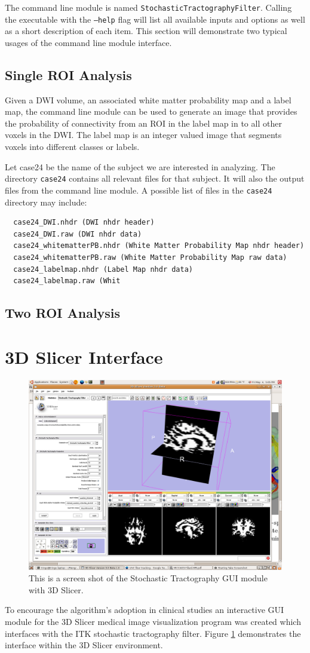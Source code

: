 The command line module is named \texttt{StochasticTractographyFilter}.  Calling the executable with the \texttt{--help} flag will list all available inputs and options as well as a short description of each item.  This section will demonstrate two typical usages of the command line module interface.

\subsection{Single ROI Analysis}
Given a DWI volume, an associated white matter probability map and a label map, the command line module can be used to generate an image that provides the probability of connectivity from an ROI in the label map in to all other voxels in the DWI.  The label map is an integer valued image that segments voxels into different classes or labels.

Let case24 be the name of the subject we are interested in analyzing.  The directory \texttt{case24} contains all relevant files for that subject.  It will also the output files from the command line module.  A possible list of files in the \texttt{case24} directory may include:
\begin{verbatim}
  case24_DWI.nhdr (DWI nhdr header)
  case24_DWI.raw (DWI nhdr data)
  case24_whitematterPB.nhdr (White Matter Probability Map nhdr header)
  case24_whitematterPB.raw (White Matter Probability Map raw data)
  case24_labelmap.nhdr (Label Map nhdr data)
  case24_labelmap.raw (Whit
\end{verbatim}

\subsection{Two ROI Analysis}

\section{3D Slicer Interface}
\begin{figure} \label{fig:slicermodule}
  \center
	\includegraphics[width=0.5\linewidth]{slicermodule}
	\caption{This is a screen shot of the Stochastic Tractography GUI module with 3D Slicer.}
\end{figure}
To encourage the algorithm's adoption in clinical studies an interactive GUI module for the 3D Slicer medical image visualization program was created which interfaces with the ITK stochastic tractography filter.  Figure \ref{fig:slicermodule} demonstrates the interface within the 3D Slicer environment.

